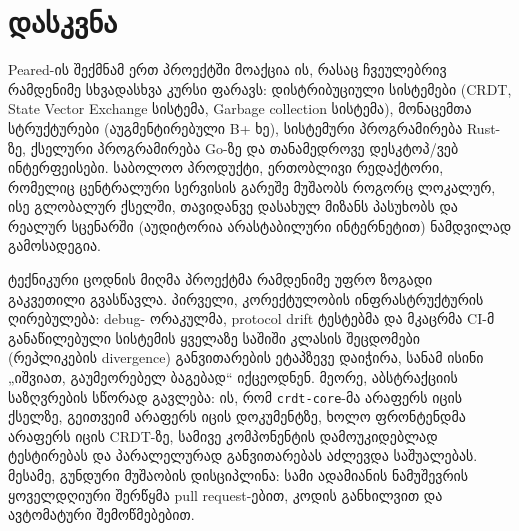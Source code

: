 \section{დასკვნა}

Peared-ის შექმნამ ერთ პროექტში მოაქცია ის, რასაც ჩვეულებრივ რამდენიმე
სხვადასხვა კურსი ფარავს: დისტრიბუციული სისტემები (CRDT,
State Vector Exchange სისტემა, Garbage collection სისტემა), მონაცემთა სტრუქტურები
(აუგმენტირებული B+ ხე), სისტემური პროგრამირება Rust-ზე, ქსელური
პროგრამირება Go-ზე და თანამედროვე დესკტოპ/ვებ ინტერფეისები. საბოლოო
პროდუქტი, ერთობლივი რედაქტორი, რომელიც ცენტრალური სერვისის გარეშე
მუშაობს როგორც ლოკალურ, ისე გლობალურ ქსელში, თავიდანვე დასახულ მიზანს
პასუხობს და რეალურ სცენარში (აუდიტორია არასტაბილური ინტერნეტით) ნამდვილად
გამოსადეგია.

ტექნიკური ცოდნის მიღმა პროექტმა რამდენიმე უფრო ზოგადი გაკვეთილი
გვასწავლა. პირველი, კორექტულობის ინფრასტრუქტურის ღირებულება: debug-
ორაკულმა, protocol drift ტესტებმა და მკაცრმა CI-მ განაწილებული სისტემის
ყველაზე საშიში კლასის შეცდომები (რეპლიკების divergence) განვითარების
ეტაპზევე დაიჭირა, სანამ ისინი „იშვიათ, გაუმეორებელ ბაგებად“ იქცეოდნენ.
მეორე, აბსტრაქციის საზღვრების სწორად გავლება: ის, რომ \texttt{crdt-core}-მა
არაფერს იცის ქსელზე, გეითვეიმ არაფერს იცის დოკუმენტზე, ხოლო ფრონტენდმა
არაფერს იცის CRDT-ზე, სამივე კომპონენტის დამოუკიდებლად ტესტირებას და
პარალელურად განვითარებას აძლევდა საშუალებას. მესამე, გუნდური მუშაობის დისციპლინა: სამი ადამიანის
ნამუშევრის ყოველდღიური შერწყმა pull request-ებით, კოდის განხილვით და
ავტომატური შემოწმებებით.

